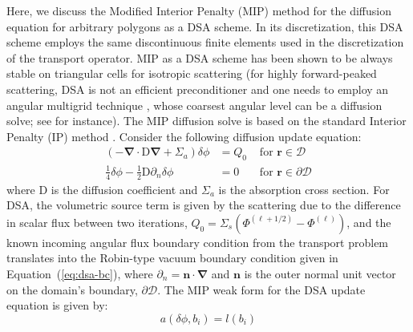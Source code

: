 \documentclass[preprint,10pt]{elsarticle}
\newcommand\grad{\boldsymbol{\nabla}}
\newcommand\bo{\boldsymbol{\Omega}}
\newcommand\br{\mathbf{r}}
\newcommand\bs{\boldsymbol}
\newcommand\mc{\mathcal}
\renewcommand{\(}{\left(}
\renewcommand{\)}{\right)}
\renewcommand{\[}{\left[}
\renewcommand{\]}{\right]}
\newcommand\vn{\bs{n}}
\begin{document}
Here, we discuss the Modified Interior Penalty (MIP) method for the diffusion equation for arbitrary polygons
as a DSA scheme. 
In its discretization, this DSA scheme employs the same discontinuous finite elements used in the 
discretization of the transport operator. 
MIP as a DSA scheme has been shown to be always stable on triangular cells for isotropic scattering \cite{mip}
(for highly forward-peaked scattering, DSA is not an efficient preconditioner and one needs to employ
an angular multigrid technique \cite{angular_multigrid_1d}, whose coarsest angular level can be a diffusion solve;
see \cite{angular_multigrid_bruno} for instance). 
The MIP diffusion solve is based on the standard Interior Penalty (IP) method
\cite{Kanschat2007}.
Consider the following diffusion update equation:
%
\begin{align}
  \label{eq:dsa}
  \left(-\grad \cdot \mathrm{D} \grad  + \Sigma_a \right) \delta \phi &= Q_0 &\textrm{ for }\br \in
  \mc{D}\\
  \label{eq:dsa-bc}
  \frac{1}{4}\delta \phi - \frac{1}{2} \mathrm{D} \partial_n \delta \phi & = 0 &\textrm{ for }
  \br \in \partial \mc{D} %
\end{align}
%
where $\mathrm{D}$ is the diffusion coefficient and $\Sigma_a$ is the absorption cross section. 
%
%
For DSA, the volumetric source term is given by the scattering due to the difference in scalar flux
between two iterations, $Q_0=\Sigma_s\(\Phi^{(\ell+1/2)}-\Phi^{(\ell)}\)$, 
%
%
and the known incoming angular flux boundary condition from the transport problem translates into the Robin-type
vacuum boundary condition given in Equation~\textup {(\ref {eq:dsa-bc})}, where $\partial_{n} = \vn\cdot \grad$
and $\vn$ is the outer normal unit vector on the domain's boundary, $\partial \mc{D}$. 
%
%
The MIP weak form for the DSA update equation is given by:
\begin{equation}
a(\delta \phi,b_i) = l(b_i)
\label{mip}
\end{equation}
\end{document}
